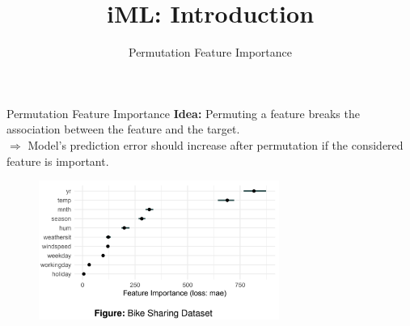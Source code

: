 \documentclass[aspectratio=169]{../latex_main/tntbeamer}  %
\title[Introduction]{iML: Introduction}
\subtitle{Permutation Feature Importance}
\begin{document}
	
	\maketitle

\begin{frame}{Permutation Feature Importance }
\textbf{Idea:} Permuting a feature breaks the association between the feature and the target.\\
\smallskip\pause
$\Rightarrow$ Model's prediction error should increase after permutation if the considered feature is important.

\pause
\begin{figure}
  \includegraphics[width=0.7\textwidth]{figure/feature-importance.png}
\end{figure}

\end{frame}
\end{document}
